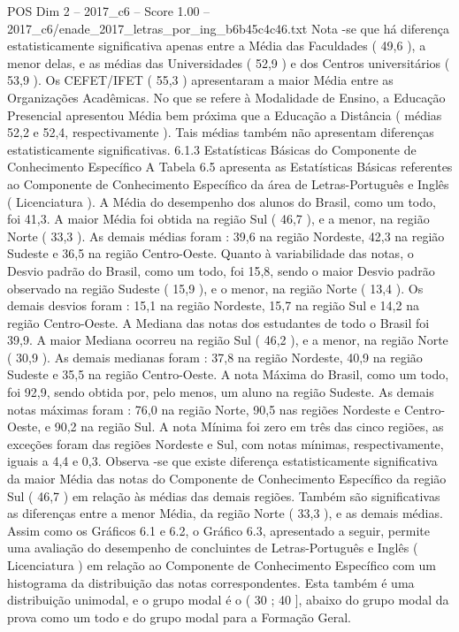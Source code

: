 \begin{textsample}{POS Dim 2 – 2017\_c6 – Score 1.00 – 2017\_c6/enade\_2017\_letras\_por\_ing\_b6b45c4c46.txt}
Nota -se que há diferença estatisticamente significativa apenas entre a Média das Faculdades ( 49,6 ), a menor delas, e as médias das Universidades ( 52,9 ) e dos Centros universitários ( 53,9 ).
Os CEFET/IFET ( 55,3 ) apresentaram a maior Média entre as Organizações Acadêmicas.
No que se refere à Modalidade de Ensino, a Educação Presencial apresentou Média bem próxima que a Educação a Distância ( médias 52,2 e 52,4, respectivamente ).
Tais médias também não apresentam diferenças estatisticamente significativas. 6.1.3 Estatísticas Básicas do Componente de Conhecimento Específico A Tabela 6.5 apresenta as Estatísticas Básicas referentes ao Componente de Conhecimento Específico da área de Letras-Português e Inglês ( Licenciatura ).
A Média do desempenho dos alunos do Brasil, como um todo, foi 41,3.
A maior Média foi obtida na região Sul ( 46,7 ), e a menor, na região Norte ( 33,3 ).
As demais médias foram : 39,6 na região Nordeste, 42,3 na região Sudeste e 36,5 na região Centro-Oeste.
Quanto à variabilidade das notas, o Desvio padrão do Brasil, como um todo, foi 15,8, sendo o maior Desvio padrão observado na região Sudeste ( 15,9 ), e o menor, na região Norte ( 13,4 ).
Os demais desvios foram : 15,1 na região Nordeste, 15,7 na região Sul e 14,2 na região Centro-Oeste.
A Mediana das notas dos estudantes de todo o Brasil foi 39,9.
A maior Mediana ocorreu na região Sul ( 46,2 ), e a menor, na região Norte ( 30,9 ).
As demais medianas foram : 37,8 na região Nordeste, 40,9 na região Sudeste e 35,5 na região Centro-Oeste.
A nota Máxima do Brasil, como um todo, foi 92,9, sendo obtida por, pelo menos, um aluno na região Sudeste.
As demais notas máximas foram : 76,0 na região Norte, 90,5 nas regiões Nordeste e Centro-Oeste, e 90,2 na região Sul.
A nota Mínima foi zero em três das cinco regiões, as exceções foram das regiões Nordeste e Sul, com notas mínimas, respectivamente, iguais a 4,4 e 0,3.
Observa -se que existe diferença estatisticamente significativa da maior Média das notas do Componente de Conhecimento Específico da região Sul ( 46,7 ) em relação às médias das demais regiões.
Também são significativas as diferenças entre a menor Média, da região Norte ( 33,3 ), e as demais médias.
Assim como os Gráficos 6.1 e 6.2, o Gráfico 6.3, apresentado a seguir, permite uma avaliação do desempenho de concluintes de Letras-Português e Inglês ( Licenciatura ) em relação ao Componente de Conhecimento Específico com um histograma da distribuição das notas correspondentes.
Esta também é uma distribuição unimodal, e o grupo modal é o ( 30 ; 40 ], abaixo do grupo modal da prova como um todo e do grupo modal para a Formação Geral.

\end{textsample}
